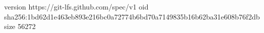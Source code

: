 version https://git-lfs.github.com/spec/v1
oid sha256:1bd62d1e463eb893e216bc0a72774b6bd70a7149835b16b62ba31e608b76f2db
size 56272
